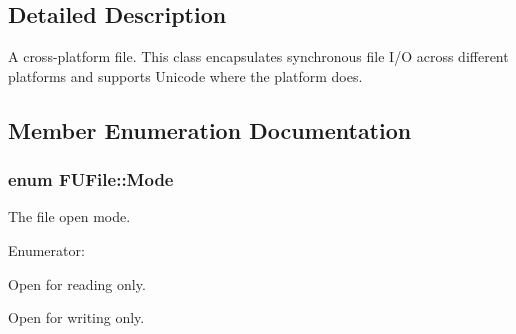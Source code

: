 \subsection{Detailed Description}
A cross-\/platform file. This class encapsulates synchronous file I/O across different platforms and supports Unicode where the platform does. 

\subsection{Member Enumeration Documentation}
\hypertarget{classFUFile_a68a459ccb913df26fe3cf6b123522849}{
\subsubsection[{Mode}]{\setlength{\rightskip}{0pt plus 5cm}enum {\bf FUFile::Mode}}}
\label{classFUFile_a68a459ccb913df26fe3cf6b123522849}
The file open mode. \begin{Desc}
\item[Enumerator: ]\par
\begin{description}
\item[{\em 
\hypertarget{classFUFile_a68a459ccb913df26fe3cf6b123522849a720d45bf59ced12f7285a497effb2a06}{
READ}
\label{classFUFile_a68a459ccb913df26fe3cf6b123522849a720d45bf59ced12f7285a497effb2a06}
}]Open for reading only. \item[{\em 
\hypertarget{classFUFile_a68a459ccb913df26fe3cf6b123522849a75ef4d7c51bce81db06487c168b76a49}{
WRITE}
\label{classFUFile_a68a459ccb913df26fe3cf6b123522849a75ef4d7c51bce81db06487c168b76a49}
}]Open for writing only. \end{description}
\end{Desc}



